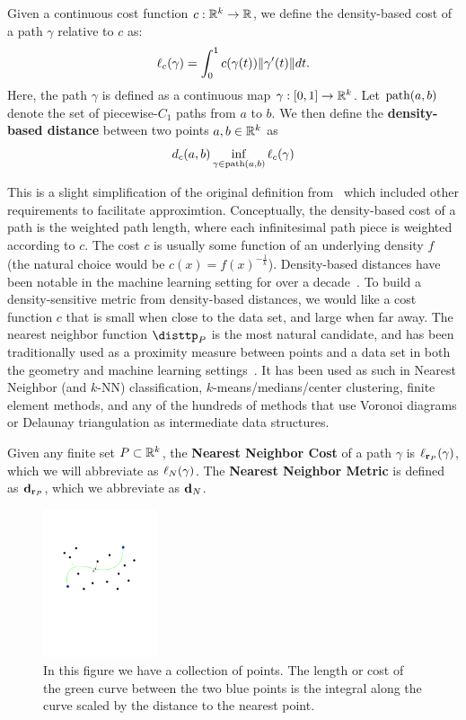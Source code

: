 \begin{definition}
Given a continuous cost function $c:\mathbb{R}^k \rightarrow \mathbb{R}$, we define the density-based
cost of a path $\gamma$ relative to $c$ as:
\[ \ell_c(\gamma) = \int_{0}^1 c(\gamma(t)) \| \gamma'(t) \|dt. \]
Here, the path $\gamma$ is defined as a continuous map $\gamma:[0,1]
\to \mathbb{R}^k$.
Let $\mathrm{path}(a,b)$ denote the set of piecewise-$C_1$ paths from $a$ to $b$.
We then define the \textbf{density-based distance} between two points $a, b \in
\mathbb{R}^k$ as
\[ d_c(a,b) \inf_{\gamma\in\mathrm{path}(a,b)} \ell_c(\gamma)\]
\end{definition}

This is a slight simplification of the original definition from~\cite{sajama05estimatingDBDM} which included other requirements to facilitate approximtion.
Conceptually, the density-based cost of a path is the weighted path length, where each infinitesimal path piece is weighted according to $c$.
The cost $c$ is usually some function of an underlying density $f$ (the natural choice would be $c(x) = f(x)^{-\frac{1}{k}}$).
Density-based distances have been notable in the machine learning setting for over a decade~\cite{sajama05estimatingDBDM,bijral11semiSupLearningDBD}.
To build a density-sensitive metric from density-based distances, we would like a cost function $c$ that is small when close to the data set, and large when far away.
The nearest neighbor function $\disttp_P$ is the most natural candidate, and has been traditionally used as a proximity
measure between points and a data set in both the geometry and machine learning settings~\cite{}. It has been used as such in Nearest Neighbor
(and $k$-NN) classification, $k$-means/medians/center clustering, finite
element methods, and any of the hundreds of methods that use Voronoi
diagrams or Delaunay triangulation as intermediate data structures.

\begin{definition} Given any finite set $P\subset \mathbb{R}^k$, the \textbf{Nearest Neighbor Cost} of a path $\gamma$ is $\ell_{\mathbf{r}_P}(\gamma)$, which we will abbreviate as
$\ell_N(\gamma)$.
The \textbf{Nearest Neighbor Metric} is
defined as $\mathbf{d}_{\mathbf{r}_P}$, which we abbreviate as $\mathbf{d}_N$.
\end{definition}
\begin{figure}[htbp]
  \centering
    \includegraphics[width=0.3\textwidth]{Figures/example.pdf}
    \caption{In this figure we have a collection of points.
      The length or cost of the green curve between the two blue points
      is the integral along the curve scaled by the distance to the nearest
point.}
  \label{fig:example}
\end{figure}

